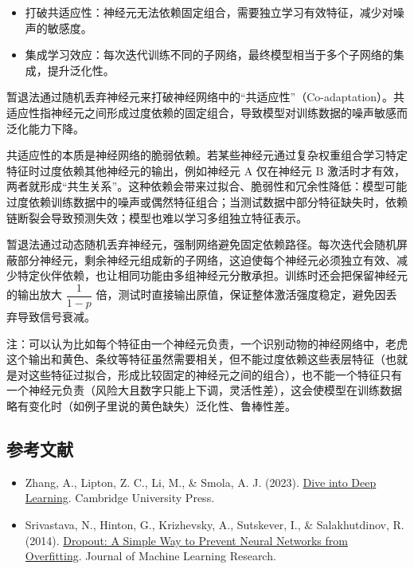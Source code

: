 \begin{itemize}
\tightlist
\item
  打破共适应性：神经元无法依赖固定组合，需要独立学习有效特征，减少对噪声的敏感度。
\item
  集成学习效应：每次迭代训练不同的子网络，最终模型相当于多个子网络的集成，提升泛化性。
\end{itemize}

暂退法通过随机丢弃神经元来打破神经网络中的``共适应性''（Co-adaptation）。共适应性指神经元之间形成过度依赖的固定组合，导致模型对训练数据的噪声敏感而泛化能力下降。

共适应性的本质是神经网络的脆弱依赖。若某些神经元通过复杂权重组合学习特定特征时过度依赖其他神经元的输出，例如神经元 A 仅在神经元 B 激活时才有效，两者就形成``共生关系''。这种依赖会带来过拟合、脆弱性和冗余性降低：模型可能过度依赖训练数据中的噪声或偶然特征组合；当测试数据中部分特征缺失时，依赖链断裂会导致预测失效；模型也难以学习多组独立特征表示。

暂退法通过动态随机丢弃神经元，强制网络避免固定依赖路径。每次迭代会随机屏蔽部分神经元，剩余神经元组成新的子网络，这迫使每个神经元必须独立有效、减少特定伙伴依赖，也让相同功能由多组神经元分散承担。训练时还会把保留神经元的输出放大 \(\dfrac{1}{1-p}\) 倍，测试时直接输出原值，保证整体激活强度稳定，避免因丢弃导致信号衰减。

注：可以认为比如每个特征由一个神经元负责，一个识别动物的神经网络中，老虎这个输出和黄色、条纹等特征虽然需要相关，但不能过度依赖这些表层特征（也就是对这些特征过拟合，形成比较固定的神经元之间的组合），也不能一个特征只有一个神经元负责（风险大且数字只能上下调，灵活性差），这会使模型在训练数据略有变化时（如例子里说的黄色缺失）泛化性、鲁棒性差。

\FloatBarrier
{}
\hypertarget{ux53c2ux8003ux6587ux732e-6}{%
\subsection{参考文献}\label{ux53c2ux8003ux6587ux732e-6}}

\vspace{0.25em}
\begin{itemize}
\tightlist
\item
  Zhang, A., Lipton, Z. C., Li, M., \& Smola, A. J. (2023). \href{https://D2L.ai}{Dive into Deep Learning}. Cambridge University Press.
\item
  Srivastava, N., Hinton, G., Krizhevsky, A., Sutskever, I., \& Salakhutdinov, R. (2014). \href{https://jmlr.org/papers/v15/srivastava14a.html}{Dropout: A Simple Way to Prevent Neural Networks from Overfitting}. Journal of Machine Learning Research.
\end{itemize}

\clearpage
